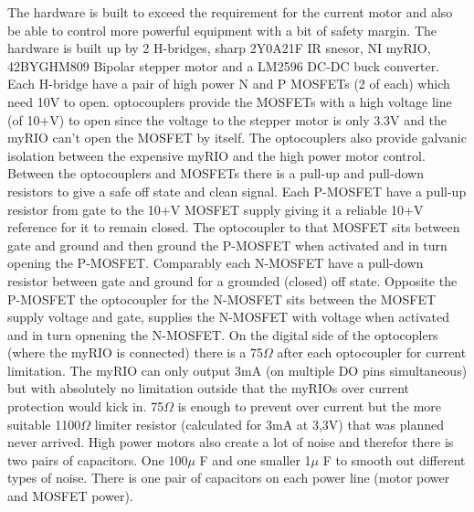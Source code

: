 The hardware is built to exceed the requirement for the current motor and also be able to control more powerful equipment with a bit of safety margin. \newline
The hardware is built up by 2 H-bridges, sharp 2Y0A21F IR snesor, NI myRIO, 42BYGHM809 Bipolar stepper motor and a LM2596 DC-DC buck converter. 
Each H-bridge have a pair of high power N and P MOSFETs (2 of each) which need 10V to open. optocouplers provide the MOSFETs with a high voltage line (of 10+V) to open since the voltage to the stepper motor is only 3.3V and the myRIO can't open the MOSFET by itself. The optocouplers also provide galvanic isolation between the expensive myRIO and the high power motor control. 
Between the optocouplers and MOSFETs there is a pull-up and pull-down resistors to give a safe off state and clean signal.\newline
Each P-MOSFET have a pull-up resistor from gate to the 10+V MOSFET supply giving it a reliable 10+V reference for it to remain closed. The optocoupler to that MOSFET sits between gate and ground and then ground the P-MOSFET when activated and in turn opening the P-MOSFET.\newline
Comparably each N-MOSFET have a pull-down resistor between gate and ground for a grounded (closed) off state. Opposite the P-MOSFET the optocoupler for the N-MOSFET sits between the MOSFET supply voltage and gate, supplies the N-MOSFET with voltage when activated and in turn opnening the N-MOSFET.\newline
On the digital side of the optocoplers (where the myRIO is connected) there is a 75$\Omega$ after each optocoupler for current limitation. The myRIO can only output 3mA (on multiple DO pins simultaneous) but with absolutely no limitation outside that the myRIOs over current protection would kick in. 75$\Omega$ is enough to prevent over current but the more suitable 1100$\Omega$ limiter resistor (calculated for 3mA at 3,3V) that was planned never arrived.\newline
High power motors also create a lot of noise and therefor there is two pairs of capacitors. One 100$\mu$ F and one smaller 1$\mu$ F to smooth out different types of noise. There is one pair of capacitors on each power line (motor power and MOSFET power).